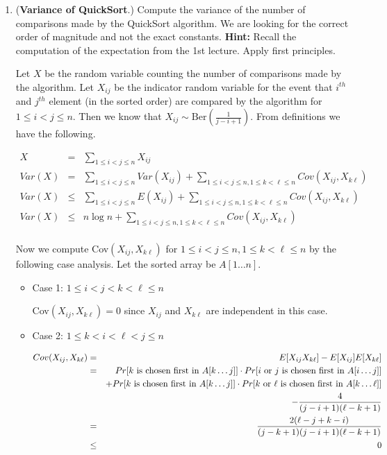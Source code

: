 \documentclass[11pt]{article}
\begin{document}
\begin{enumerate}
\item  ({\bf Variance of QuickSort}.) 
Compute the variance of the number of comparisons made by the QuickSort algorithm. We are looking for the correct order of magnitude and not the exact constants.
{\bf Hint:} Recall the computation of the expectation from the 1st lecture. Apply first principles.

\Sol Let $X$ be the random variable counting the number of comparisons made by the algorithm. Let $X_{ij}$ be the indicator random variable for the event that $i^{th}$ and $j^{th}$ element (in the sorted order) are compared by the algorithm for $1\le i< j\le n$. Then we know that $X_{ij} \sim \text{Ber}(\frac{1}{j-i+1})$. From definitions we have the following.

\begin{eqnarray*}
 X &=& \sum_{1\le i<j\le n} X_{ij}\\
 Var(X) &=& \sum_{1\le i<j\le n} Var(X_{ij}) + \sum_{1\le i<j\le n,1\le k<\ell\le n} Cov(X_{ij}, X_{k\ell})\\
 Var(X) &\le& \sum_{1\le i<j\le n} E(X_{ij}) + \sum_{1\le i<j\le n,1\le k<\ell\le n} Cov(X_{ij}, X_{k\ell})\\
 Var(X) &\le& n\log n + \sum_{1\le i<j\le n,1\le k<\ell\le n} Cov(X_{ij}, X_{k\ell})\\
\end{eqnarray*}

Now we compute Cov$(X_{ij}, X_{k\ell})$ for $1\le i<j\le n,1\le k<\ell\le n$ by the following case analysis. Let the sorted array be $A[1\ldots n]$.

\begin{itemize}
 \item Case 1: $1\le i<j<k<\ell\le n$ 
 
 Cov$(X_{ij}, X_{k\ell}) = 0$ since $X_{ij}$ and $X_{k\ell}$ are independent in this case.
 
 \item Case 2: $1\le k<i<\ell<j\le n$
 
 \begin{eqnarray*}
  Cov(X_{ij}, X_{k\ell}) &=& E[X_{ij}X_{k\ell}] - E[X_{ij}]E[X_{k\ell}]\\
  &=& Pr[k \text{ is chosen first in } A[k\ldots j]]\cdot Pr[i \text{ or } j \text{ is chosen first in } A[i\ldots j]]\\
  && + Pr[k \text{ is chosen first in } A[k\ldots j]]\cdot Pr[k \text{ or } \ell \text{ is chosen first in } A[k\ldots \ell]]\\
  && - \frac{4}{(j-i+1)(\ell-k+1)}\\
  &=& \frac{2(\ell - j + k-i)}{(j-k+1)(j-i+1)(\ell-k+1)}\\
  &\le& 0
 \end{eqnarray*}
 

\end{itemize}
\end{enumerate}
\end{document}
